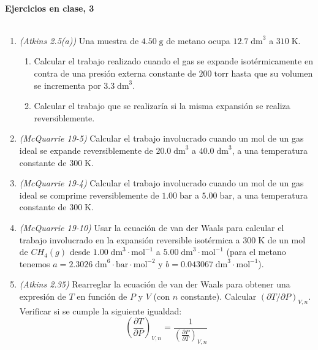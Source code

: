 \documentclass[a4paper,12pt]{article}
\begin{document}

\begin{center}
\HRule \\[0.4cm]
{ \bfseries Ejercicios en clase, 3}\\ %
\HRule \\[0.4cm]
\end{center}


\begin{enumerate}

 \item \textit{(Atkins 2.5(a))} Una muestra de $4.50\;\mbox{g}$ de metano ocupa $12.7\;\mbox{dm}^3$ a $310\;\mbox{K}$. 
 \begin{enumerate} 
   \item Calcular el trabajo realizado cuando el gas se expande isot\'ermicamente en contra de una presi\'on externa constante de $200\;\mbox{torr}$ hasta que su volumen se incrementa por $3.3\;\mbox{dm}^3$.
   \item Calcular el trabajo que se realizar\'ia si la misma expansi\'on se realiza reversiblemente.
 \end{enumerate} %

 \item \textit{(McQuarrie 19-5)} Calcular el trabajo involucrado cuando un mol de un gas ideal se expande reversiblemente de $20.0\;\mbox{dm}^3$ a $40.0\;\mbox{dm}^3$, a una temperatura constante de $300\;\mbox{K}$. %

 \item \textit{(McQuarrie 19-4)} Calcular el trabajo involucrado cuando un mol de un gas ideal se comprime reversiblemente de $1.00\;\mbox{bar}$ a $5.00\;\mbox{bar}$, a una temperatura constante de $300\;\mbox{K}$. %

 \item \textit{(McQuarrie 19-10)} Usar la ecuaci\'on de van der Waals para calcular el trabajo involucrado en la expansi\'on reversible isot\'ermica a $300\;\mbox{K}$ de un mol de $CH_4(g)$ desde $1.00\;\mbox{dm}^3\cdot\mbox{mol}^{-1}$ a $5.00\;\mbox{dm}^3\cdot\mbox{mol}^{-1}$ (para el metano tenemos $a=2.3026\;\mbox{dm}^6\cdot\mbox{bar}\cdot\mbox{mol}^{-2}$ y $b=0.043067\;\mbox{dm}^3\cdot\mbox{mol}^{-1}$). %

 \item \textit{(Atkins 2.35)} Rearreglar la ecuaci\'on de van der Waals para obtener una expresi\'on de $T$ en funci\'on de $P$ y $V$ (con $n$ constante). Calcular $(\partial T/\partial P)_{V,n}$. Verificar si se cumple la siguiente igualdad:
$$\left(\frac{\partial T}{\partial P}\right)_{V,n}=\frac{1}{\left(\frac{\partial P}{\partial T}\right)_{V,n}}$$ %

\end{enumerate}
\end{document}
